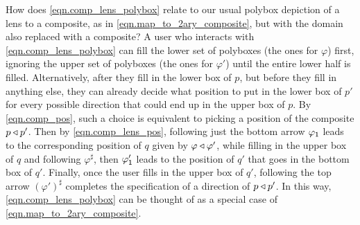 \documentclass[Book-Poly]{subfiles}
\begin{document}
How does \eqref{eqn.comp_lens_polybox} relate to our usual polybox depiction of a lens to a composite, as in \eqref{eqn.map_to_2ary_composite}, but with the domain also replaced with a composite?
A user who interacts with \eqref{eqn.comp_lens_polybox} can fill the lower set of polyboxes (the ones for $\varphi$) first, ignoring the upper set of polyboxes (the ones for $\varphi'$) until the entire lower half is filled.
Alternatively, after they fill in the lower box of $p$, but before they fill in anything else, they can already decide what position to put in the lower box of $p'$ for every possible direction that could end up in the upper box of $p$.
By \eqref{eqn.comp_pos}, such a choice is equivalent to picking a position of the composite $p\mathbin{\triangleleft} p'$.
Then by \eqref{eqn.comp_lens_pos}, following just the bottom arrow $\varphi_{\textsf{1}}$ leads to the corresponding position of $q$ given by $\varphi\mathbin{\triangleleft} \varphi'$, while filling in the upper box of $q$ and following $\varphi^\sharp$, then $\varphi'_{\textsf{1}}$ leads to the position of $q'$ that goes in the bottom box of $q'$.
Finally, once the user fills in the upper box of $q'$, following the top arrow $(\varphi')^\sharp$ completes the specification of a direction of $p\mathbin{\triangleleft} p'$.
In this way, \eqref{eqn.comp_lens_polybox} can be thought of as a special case of \eqref{eqn.map_to_2ary_composite}.
\end{document}
